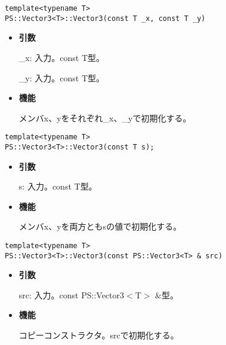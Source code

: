 \begin{screen}
\begin{verbatim}
template<typename T>
PS::Vector3<T>::Vector3(const T _x, const T _y)
\end{verbatim}
\end{screen}

\begin{itemize}

\item{{\bf 引数}}

{\_x}: 入力。{const T}型。

{\_y}: 入力。{const T}型。

\item{{\bf 機能}}

メンバ{x}、{y}をそれぞれ{\_x}、{\_y}で初期化する。

\end{itemize}

\begin{screen}
\begin{verbatim}
template<typename T>
PS::Vector3<T>::Vector3(const T s);
\end{verbatim}
\end{screen}

\begin{itemize}

\item{{\bf 引数}}

{s}: 入力。{const T}型。

\item{{\bf 機能}}

メンバ{x}、{y}を両方とも{s}の値で初期化する。

\end{itemize}

\mbox{}

\begin{screen}
\begin{verbatim}
template<typename T>
PS::Vector3<T>::Vector3(const PS::Vector3<T> & src)
\end{verbatim}
\end{screen}

\begin{itemize}

\item{{\bf 引数}}

{src}: 入力。{const PS::Vector3$<$T$>$ \&}型。

\item{{\bf 機能}}

コピーコンストラクタ。{src}で初期化する。

\end{itemize}

